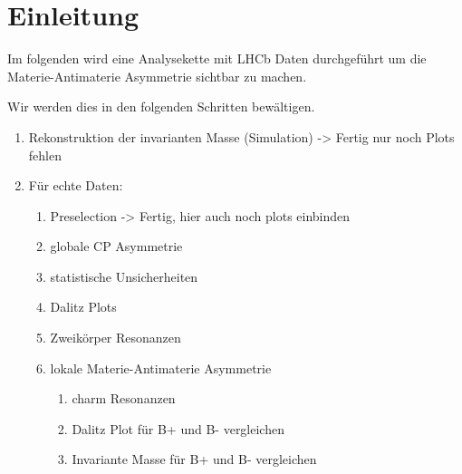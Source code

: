 \section{Einleitung}
\label{sec:einleitung}
Im folgenden wird eine Analysekette mit LHCb Daten durchgef\"uhrt um die Materie-Antimaterie Asymmetrie sichtbar zu machen.

Wir werden dies in den folgenden Schritten bew\"altigen.
\begin{enumerate}
  \item Rekonstruktion der invarianten Masse (Simulation) -> Fertig nur noch Plots fehlen
  \item F\"ur echte Daten:
  \begin{enumerate}
    \item Preselection -> Fertig, hier auch noch plots einbinden
    \item globale CP Asymmetrie
    \item statistische Unsicherheiten
    \item Dalitz Plots
    \item Zweik\"orper Resonanzen
    \item lokale Materie-Antimaterie Asymmetrie
    \begin{enumerate}
      \item charm Resonanzen
      \item Dalitz Plot f\"ur B+ und B- vergleichen
      \item Invariante Masse f\"ur B+ und B- vergleichen
    \end{enumerate}
  \end{enumerate}
\end{enumerate}
